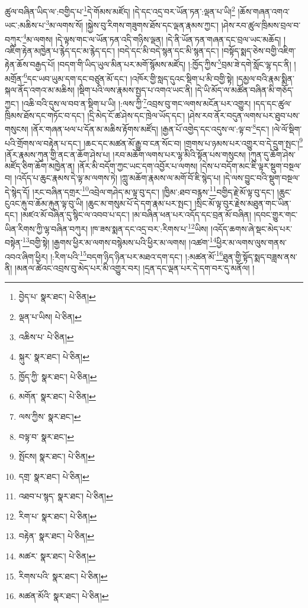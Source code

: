 ཚུལ་བཞིན་ཡིད་ལ་:བགྱིད་པ་\footnote{བྱེད་པ་  སྣར་ཐང་།  པེ་ཅིན། }དེ་གོམས་མཛོད། །དེ་དང་འདྲ་བར་ཡོན་ཏན་:ལྡན་པ་ཡི།\footnote{ལྡན་པ་ཡིས།  པེ་ཅིན། } །ཆོས་གཞན་འགའ་ཡང་:མཆིས་པ་\footnote{འཆིས་པ་  པེ་ཅིན། }མ་ལགས་སོ། །སྐྱེས་བུ་རིགས་གཟུགས་ཐོས་དང་ལྡན་རྣམས་ཀྱང་། །ཤེས་རབ་ཚུལ་ཁྲིམས་བྲལ་བ་བཀུར་\footnote{སྐུར་  སྣར་ཐང་།  པེ་ཅིན། }མ་ལགས། །དེ་ལྟས་གང་ལ་ཡོན་ཏན་འདི་གཉིས་ལྡན། །དེ་ནི་ཡོན་ཏན་གཞན་དང་བྲལ་ཡང་མཆོད། །འཇིག་རྟེན་མཁྱེན་པ་རྙེད་དང་མ་རྙེད་དང་། །བདེ་དང་མི་བདེ་སྙན་དང་མི་སྙན་དང་། །བསྟོད་སྨད་ཅེས་བགྱི་འཇིག་རྟེན་ཆོས་བརྒྱད་པོ། །བདག་གི་ཡིད་ཡུལ་མིན་པར་མགོ་སྙོམས་མཛོད། །:ཁྱོད་ཀྱིས་\footnote{ཁྱོད་ཀྱི་  སྣར་ཐང་།  པེ་ཅིན། }བྲམ་ཟེ་དགེ་སློང་ལྷ་དང་ནི། །མགྲོན་\footnote{མགོན་  སྣར་ཐང་།  པེ་ཅིན། }དང་ཡབ་ཡུམ་དག་དང་བཙུན་མོ་དང་། །འཁོར་གྱི་སླད་དུའང་སྡིག་པ་མི་བགྱི་སྟེ། །དམྱལ་བའི་རྣམ་སྨིན་སྐལ་ནོད་འགའ་མ་མཆིས། །སྡིག་པའི་ལས་རྣམས་སྤྱད་པ་འགའ་ཡང་ནི། །དེ་ཡི་མོད་ལ་མཚོན་བཞིན་མི་གཅོད་ཀྱང་། །འཆི་བའི་དུས་ལ་བབ་ན་སྡིག་པ་ཡི། །:ལས་ཀྱི་\footnote{ལས་ཀྱིས་  སྣར་ཐང་། }འབྲས་བུ་གང་ལགས་མངོན་པར་འགྱུར། །དད་དང་ཚུལ་ཁྲིམས་ཐོས་དང་གཏོང་བ་དང་། །དྲི་མེད་ངོ་ཚ་ཤེས་དང་ཁྲེལ་ཡོད་དང་། །ཤེས་རབ་ནོར་བདུན་ལགས་པར་ཐུབ་པས་གསུངས། །ནོར་གཞན་ཕལ་པ་དོན་མ་མཆིས་རྟོགས་མཛོད། །རྒྱན་པོ་འགྱེད་དང་འདུས་ལ་:ལྟ་བ་\footnote{བལྟ་བ་  སྣར་ཐང་། }དང་། །ལེ་ལོ་སྡིག་པའི་གྲོགས་ལ་བརྟེན་པ་དང་། །ཆང་དང་མཚན་མོ་རྒྱུ་བ་ངན་སོང་བ། །གྲགས་པ་ཉམས་པར་འགྱུར་བ་དེ་དྲུག་སྤང་།\footnote{སྤོངས།  སྣར་ཐང་།  པེ་ཅིན། } །ནོར་རྣམས་ཀུན་གྱི་ནང་ན་ཆོག་ཤེས་པ། །རབ་མཆོག་ལགས་པར་ལྷ་མིའི་སྟོན་པས་གསུངས། །ཀུན་དུ་ཆོག་ཤེས་མཛོད་ཅིག་ཆོག་མཁྱེན་ན། །ནོར་མི་བདོག་ཀྱང་ཡང་དག་འབྱོར་པ་ལགས། །དེས་པ་བདོག་མང་ཇི་ལྟར་སྡུག་བསྔལ་བ། །འདོད་པ་ཆུང་རྣམས་དེ་ལྟ་མ་ལགས་ཏེ། །ཀླུ་མཆོག་རྣམས་ལ་མགོ་བོ་ཇི་སྙེད་པ། །དེ་ལས་བྱུང་བའི་སྡུག་བསྔལ་དེ་སྙེད་དོ། །རང་བཞིན་དགྲར་\footnote{དགྲ་  སྣར་ཐང་།  པེ་ཅིན། }འབྲེལ་གཤེད་མ་ལྟ་བུ་དང་། །ཁྱིམ་:ཐབ་བརྙས་\footnote{འཐབ་པ་སྙད་  སྣར་ཐང་།  པེ་ཅིན། }བགྱིད་རྗེ་མོ་ལྟ་བུ་དང་། །ཆུང་ངུའང་རྐུ་བ་ཆོམ་རྐུན་ལྟ་བུ་ཡི། །ཆུང་མ་གསུམ་པོ་དེ་དག་རྣམ་པར་སྤང་། །སྲིང་མོ་ལྟ་བུར་རྗེས་མཐུན་གང་ཡིན་དང་། །མཛའ་མོ་བཞིན་དུ་སྙིང་ལ་འབབ་པ་དང་། །མ་བཞིན་ཕན་པར་འདོད་དང་བྲན་མོ་བཞིན། །དབང་གྱུར་གང་ཡིན་རིགས་ཀྱི་ལྷ་བཞིན་བཀུར། །ཁ་ཟས་སྨན་དང་འདྲ་བར་:རིགས་པ་\footnote{རིག་པ་  སྣར་ཐང་།  པེ་ཅིན། }ཡིས། །འདོད་ཆགས་ཞེ་སྡང་མེད་པར་བསྟེན་\footnote{བརྟེན་  སྣར་ཐང་།  པེ་ཅིན། }བགྱི་སྟེ། །རྒྱགས་ཕྱིར་མ་ལགས་བསྙེམས་པའི་ཕྱིར་མ་ལགས། །འཚག་\footnote{མཚར་  སྣར་ཐང་།  པེ་ཅིན། }ཕྱིར་མ་ལགས་ལུས་གནས་འབའ་ཞིག་ཕྱིར། །:རིག་པའི་\footnote{རིགས་པའི་  སྣར་ཐང་།  པེ་ཅིན། }བདག་ཉིད་ཉིན་པར་མཐའ་དག་དང་། །:མཚན་མོ་\footnote{མཚན་མོའི་  སྣར་ཐང་།  པེ་ཅིན། }ཐུན་གྱི་སྟོད་སྨད་བཟླས་ནས་ནི། །མནལ་ཚེའང་འབྲས་བུ་མེད་པར་མི་འགྱུར་བར། །དྲན་དང་ལྡན་པར་དེ་དག་བར་དུ་མནོལ། །

